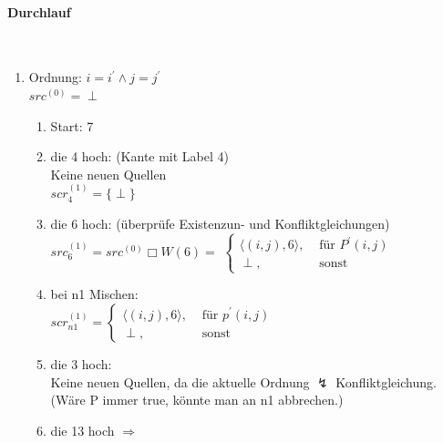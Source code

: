 \paragraph{Durchlauf}~\\
\begin{enumerate}
    \item {Ordnung: \(i=i^\prime \land j=j^\prime\) \\
        \(src^{(0)} = {\perp}\)\\
        \begin{enumerate}
            \item Start: 7
            \item die 4 hoch: (Kante mit Label 4)\\
                  Keine neuen Quellen\\
                  \(scr_{4}^{(1)} = \lbrace \perp \rbrace\)
            \item die 6 hoch: (überprüfe Existenzun- und Konfliktgleichungen)\\
                  \(src_{6}^{(1)} = src^{(0)} \Box W(6) = \)
    \(\begin{cases}  \langle (i,j), 6 \rangle , & \mbox{ für } P^\prime(i,j) \\
                     \perp ,                    & \mbox{ sonst }
    \end{cases}  \)

            \item bei n1 Mischen:\\
                \(scr_{n1}^{(1)} =
    \begin{cases} \langle (i,j),6 \rangle, & \mbox{ für } p^\prime(i,j) \\
                  \perp,                   & \mbox{ sonst }
                \end{cases} \)

            \item die 3 hoch:\\
                  Keine neuen Quellen, da die aktuelle Ordnung $\lightning$ Konfliktgleichung. (Wäre P immer true, könnte man an n1 abbrechen.)
            \item die 13 hoch \(\Rightarrow\)


\end{enumerate}}
\end{enumerate}
